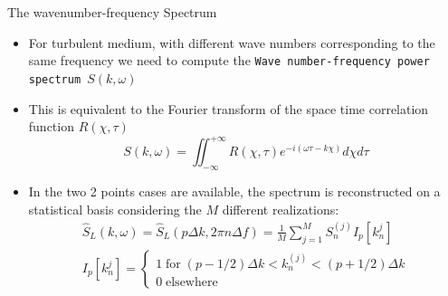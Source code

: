 \documentclass[t,10pt]{beamer}
\begin{document}
\begin{frame}{The wavenumber-frequency Spectrum}
\begin{itemize}[<+->]
\item For turbulent medium, with different wave
  numbers corresponding to the same frequency we need to compute the \textcolor{tachameleon}{\texttt{Wave
      number-frequency power spectrum $S(k,\omega)$}}
\item This is equivalent to the Fourier transform of the space time
  correlation function $R(\chi,\tau)$
\begin{equation*}
S(k,\omega)
=\iint_{-\infty}^{+\infty}R(\chi,\tau)e^{-i(\omega\tau-k\chi)}d\chi d\tau
\end{equation*}
\item In the two 2 points cases are available, the spectrum is
  reconstructed on a statistical basis considering the $M$ different realizations:
{\small\begin{gather*}
\hat{S}_L(k,\omega)=\hat{S}_L(p\Delta k,2\pi n \Delta
f)=\frac{1}{M}\sum_{j=1}^M S_n^{(j)}I_p[k_n^{j}] \\ 
I_p[k_n^{j}] = 
\begin{cases}
1 \;\text{for}\; (p-1/2)\Delta k < k_n^{(j)}< (p+1/2)\Delta k \\
0 \;\text{elsewhere}
\end{cases}
\end{gather*}}


\end{itemize}

\end{frame}
\end{document}
